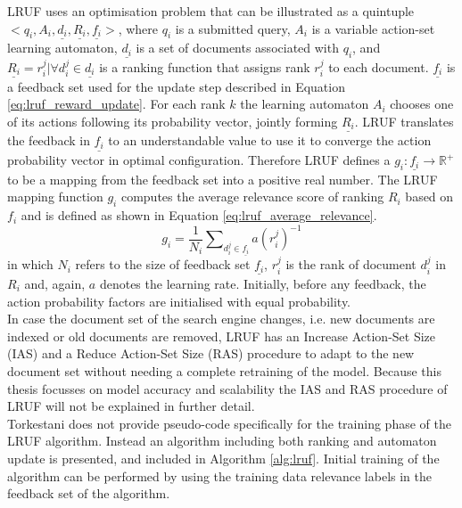 LRUF uses an optimisation problem that can be illustrated as a quintuple $<q_i,A_i,\underline{d_i},\underline{R_i},\underline{f_i}>$, where $q_i$ is a submitted query, $A_i$ is a variable action-set learning automaton, $\underline{d_i}$ is a set of documents associated with $q_i$, and $\underline{R_i}={r_i^j|\forall d_i^j \in \underline{d_i}}$ is a ranking function that assigns rank $r_i^j$ to each document. $\underline{f_i}$ is a feedback set used for the update step described in Equation \ref{eq:lruf_reward_update}. For each rank $k$ the learning automaton $A_i$ chooses one of its actions following its probability vector, jointly forming $\underline{R_i}$. LRUF translates the feedback in $\underline{f_i}$ to an understandable value to use it to converge the action probability vector in optimal configuration. Therefore LRUF defines a $g_i: \underline{f_i} \rightarrow \mathbb{R}^{+}$ to be a mapping from the feedback set into a positive real number. The LRUF mapping function $g_i$ computes the average relevance score of ranking $R_i$ based on $f_i$ and is defined as shown in Equation \ref{eq:lruf_average_relevance}.
\begin{equation}
g_i=\frac{1}{N_i}\sum\nolimits_{d_{i}^{j}\in \underline{f_i}} a(r_{i}^{j})^{-1}
\label{eq:lruf_average_relevance}
\end{equation}
\noindent in which $N_i$ refers to the size of feedback set $\underline{f_i}$, $r_i^j$ is the rank of document $d_i^j$ in $R_i$ and, again, $a$ denotes the learning rate. Initially, before any feedback, the action probability factors are initialised with equal probability.\\

In case the document set of the search engine changes, i.e. new documents are indexed or old documents are removed, LRUF has an Increase Action-Set Size (IAS) and a Reduce Action-Set Size (RAS) procedure to adapt to the new document set without needing a complete retraining of the model. Because this thesis focusses on model accuracy and scalability the IAS and RAS procedure of LRUF will not be explained in further detail.\\

Torkestani \cite{Torkestani2012b} does not provide pseudo-code specifically for the training phase of the LRUF algorithm. Instead an algorithm including both ranking and automaton update is presented, and included in Algorithm \ref{alg:lruf}. Initial training of the algorithm can be performed by using the training data relevance labels in the feedback set of the algorithm.

